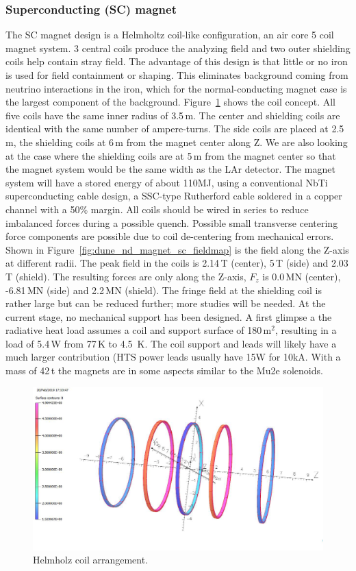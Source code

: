 \subsubsection{Superconducting (SC) magnet}
%
The SC magnet design is a Helmholtz coil-like configuration, an air core  5 coil magnet system. 3 central coils produce the analyzing field and two outer shielding coils help contain stray field. The advantage of this design is that little or no iron is used for field containment or shaping. This eliminates background coming from neutrino interactions in the iron, which for the normal-conducting magnet case is the largest component of the background. Figure~\ref{fig:dune_nd_magnet_sc_layout} shows the coil concept. All five coils have the same inner radius of 3.5\,m. The center and shielding coils are identical with the same number of ampere-turns. The side coils are placed at 2.5\,m, the shielding coils at 6\,m from the magnet center along Z.  We are also looking at the case where the shielding coils are at 5\,m from the magnet center so that the magnet system would be the same width as the LAr detector.  The magnet system will have a stored energy of about 110MJ, using a conventional NbTi superconducting cable design, a SSC-type Rutherford cable soldered in a copper channel with a 50\% margin. All coils should be wired in series to reduce imbalanced forces during a possible quench. Possible small transverse centering force components are possible due to coil de-centering from mechanical errors. 
%
Shown in Figure~\ref{fig:dune_nd_magnet_sc_fieldmap} is the field along the Z-axis at different radii. The peak field in the coils is 2.14\,T (center), 5\,T (side) and 2.03\,T (shield). The resulting forces are only along the Z-axis, $F_{z}$ is 0.0\,MN (center), -6.81\,MN (side) and 2.2\,MN (shield). The fringe field at the shielding coil is rather large but can be reduced further; more studies will be needed. At the current stage, no mechanical support has been designed. A first glimpse a the radiative heat load assumes a coil and support surface of 180\,m$^{2}$, resulting in a load of 5.4\,W from 77\,K to 4.5\, K. The coil support and leads will likely have a much larger contribution (HTS power leads usually have 15W for 10kA. With a mass of 42\,t the magnets are in some aspects similar to the Mu2e solenoids.
%
\begin{figure}[h] 
\centering
\includegraphics[width=0.95\columnwidth]{graphics/dune_nd_magnet_sc_layout.png} 
\caption{Helmholz coil arrangement.} 
\label{fig:dune_nd_magnet_sc_layout} 
\end{figure}
